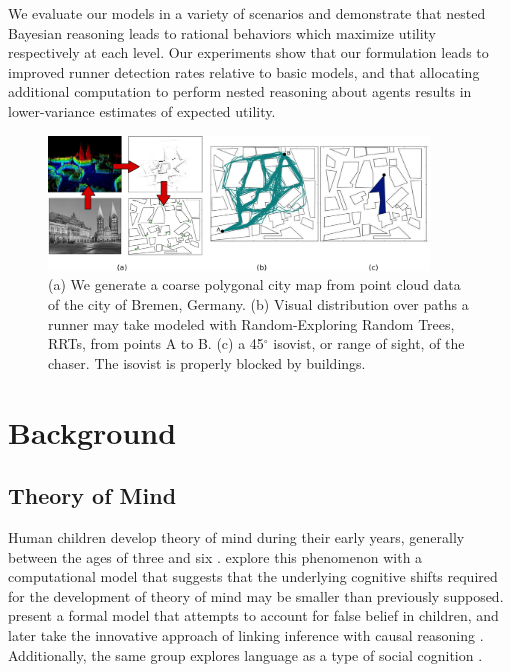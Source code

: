 \documentclass[twoside]{article}
\begin{document}
We evaluate our models in a variety of scenarios and demonstrate that nested Bayesian reasoning leads to rational behaviors which maximize utility respectively at each level. Our experiments show that our formulation leads to improved runner detection rates relative to basic models, and that allocating additional computation to perform nested reasoning about agents results in lower-variance estimates of expected utility. 






\begin{figure}
\begin{center}
\vspace{-1.0em}
\centerline{\includegraphics[width=0.9\textwidth]{sim_primitives.eps}}
\caption{(a) We generate a coarse polygonal city map from point cloud data of the city of Bremen, Germany. (b) Visual distribution over paths a runner may take
modeled with Random-Exploring Random Trees, RRTs, from points A to B. (c) a 45$^{\circ}$ isovist, or range of sight, of the
chaser.  The isovist is properly blocked by buildings.}
\label{fig:rrt}
\end{center}
\vspace{-1.0em}
\end{figure} 

\section{Background}

\vspace{-0.5em}
\subsection{Theory of Mind}

Human children develop theory of mind during their
early years, generally between the ages of three and
six
\cite{wellman1990child,chater2006probabilistic}. \textcite{bello2006developmental}
explore this phenomenon with a computational model that suggests that the underlying cognitive shifts required for the development of theory of mind may be smaller than previously supposed. 
%
\textcite{goodman2006intuitive} present a formal model that
attempts to account for false belief in
children, and later take the innovative approach of
linking inference with causal reasoning \cite{goodman2009cause}. Additionally, the same group explores language as a type of social
cognition \cite{goodman2013knowledge}.
%
\end{document}
